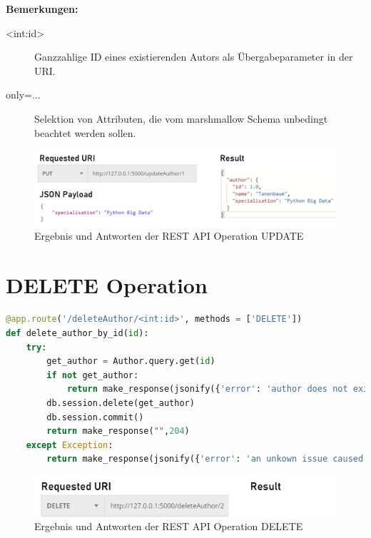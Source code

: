 \documentclass[a4paper,titlepage,halfparskip,12pt,listof=numbered]{scrreprt}
\begin{document}
\textbf{Bemerkungen:}
\begin{description}
\item[<int:id>] Ganzzahlige ID eines existierenden Autors als Übergabeparameter in der \acs{URI}.\cite{flaskDocRouting}
\item[only=...] Selektion von Attributen, die vom marshmallow Schema unbedingt beachtet werden sollen.\cite{marshmallowQuickstart}
\end{description}

\bigskip

\begin{figure}[h]
	\centering
	\includegraphics[width=\linewidth]{images/resultsUPDATE}
	\caption{Ergebnis und Antworten der \ac{REST} \ac{API} Operation UPDATE}
	\label{img:resultsUPDATE}
\end{figure}

\pagebreak

\section{DELETE Operation}

\begin{lstlisting}[language=python,caption={Code für die DELETE Operation der CRUD-Applikation}, label={lst:deleteOperationAPI}]
@app.route('/deleteAuthor/<int:id>', methods = ['DELETE'])
def delete_author_by_id(id):
    try:
        get_author = Author.query.get(id)
        if not get_author:
            return make_response(jsonify({'error': 'author does not exist.'}), 404)
        db.session.delete(get_author)
        db.session.commit()
        return make_response("",204)
    except Exception:
        return make_response(jsonify({'error': 'an unkown issue caused this error.'}), 500)
\end{lstlisting}

\bigskip

\begin{figure}[h]
	\centering
	\includegraphics[width=\linewidth]{images/resultsDELETE}
	\caption{Ergebnis und Antworten der \ac{REST} \ac{API} Operation DELETE}
	\label{img:resultsDELETE}
\end{figure}
\end{document}
